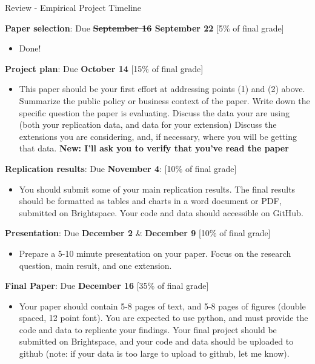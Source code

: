 \documentclass[compress, 8pt]{beamer}
\begin{document}
\begin{frame}{Review - Empirical Project Timeline}

\textbf{Paper selection}: Due \textbf{\sout{September 16} September 22} [5\% of final grade]
\begin{itemize}
\item Done! 
\end{itemize}

\textbf{Project plan}: Due \textbf{October 14} [15\% of final grade] 
\begin{itemize}
\item This paper should be your first effort at addressing points (1) and (2) above. 
Summarize the public policy or business context of the paper. 
Write down the specific question the paper is evaluating.
Discuss the data your are using (both your replication data, and data for your extension)
Discuss the extensions you are considering, and, if necessary, where you will be getting that data. \textbf{New: I'll ask you to verify that you've read the paper}
\end{itemize} 

\textbf{Replication results}: Due \textbf{November 4}: [10\% of final grade]
\begin{itemize}
\item You should submit some of your main replication results. The final results should be formatted as tables and charts in a word document or PDF, submitted on Brightspace. Your code and data should accessible on GitHub.
\end{itemize}

\textbf{Presentation}: Due \textbf{December 2} \& \textbf{December 9} [10\% of final grade]
\begin{itemize}
\item Prepare a 5-10 minute presentation on your paper. Focus on the research question, main result, and one extension. 
\end{itemize}

\textbf{Final Paper}: Due \textbf{December 16} [35\% of final grade]
\begin{itemize}
\item Your paper should contain 5-8 pages of text, and 5-8 pages of figures (double spaced, 12 point font).
You are expected to use python, and must provide the code and data to replicate your findings. 
Your final project should be submitted on Brightspace, and your code and data should be uploaded to github (note: if your data is too large to upload to github, let me know). 
\end{itemize}

\end{frame}
\end{document}
